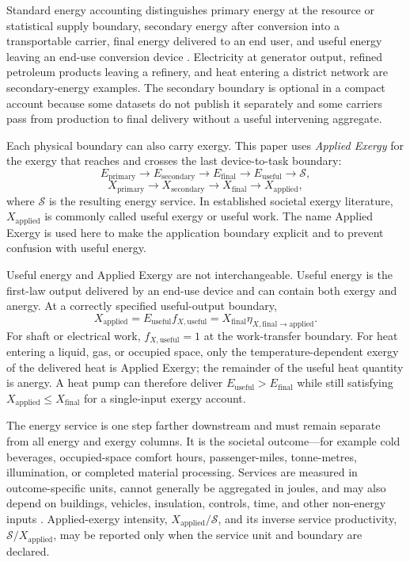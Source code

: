 \documentclass[11pt]{article}
\newcommand{\Xap}{X_{\mathrm{applied}}}
\begin{document}
Standard energy accounting distinguishes primary energy at the resource or statistical supply boundary, secondary energy after conversion into a transportable carrier, final energy delivered to an end user, and useful energy leaving an end-use conversion device \cite{ieaglossary,owiddefinitions,brockway2024}. Electricity at generator output, refined petroleum products leaving a refinery, and heat entering a district network are secondary-energy examples. The secondary boundary is optional in a compact account because some datasets do not publish it separately and some carriers pass from production to final delivery without a useful intervening aggregate.

Each physical boundary can also carry exergy. This paper uses \emph{Applied Exergy} for the exergy that reaches and crosses the last device-to-task boundary:
\begin{equation}
E_{\mathrm{primary}}\longrightarrow E_{\mathrm{secondary}}\longrightarrow E_{\mathrm{final}}\longrightarrow E_{\mathrm{useful}}\longrightarrow \mathcal{S},
\end{equation}
\begin{equation}
X_{\mathrm{primary}}\longrightarrow X_{\mathrm{secondary}}\longrightarrow X_{\mathrm{final}}\longrightarrow \Xap,
\end{equation}
where $\mathcal{S}$ is the resulting energy service. In established societal exergy literature, $\Xap$ is commonly called useful exergy or useful work. The name Applied Exergy is used here to make the application boundary explicit and to prevent confusion with useful energy.

Useful energy and Applied Exergy are not interchangeable. Useful energy is the first-law output delivered by an end-use device and can contain both exergy and anergy. At a correctly specified useful-output boundary,
\begin{equation}
\Xap=E_{\mathrm{useful}}f_{X,\mathrm{useful}}
=X_{\mathrm{final}}\eta_{X,\mathrm{final\rightarrow applied}}.
\end{equation}
For shaft or electrical work, $f_{X,\mathrm{useful}}=1$ at the work-transfer boundary. For heat entering a liquid, gas, or occupied space, only the temperature-dependent exergy of the delivered heat is Applied Exergy; the remainder of the useful heat quantity is anergy. A heat pump can therefore deliver $E_{\mathrm{useful}}>E_{\mathrm{final}}$ while still satisfying $\Xap\le X_{\mathrm{final}}$ for a single-input exergy account.

The energy service is one step farther downstream and must remain separate from all energy and exergy columns. It is the societal outcome---for example cold beverages, occupied-space comfort hours, passenger-miles, tonne-metres, illumination, or completed material processing. Services are measured in outcome-specific units, cannot generally be aggregated in joules, and may also depend on buildings, vehicles, insulation, controls, time, and other non-energy inputs \cite{ieaglossary}. Applied-exergy intensity, $\Xap/\mathcal{S}$, and its inverse service productivity, $\mathcal{S}/\Xap$, may be reported only when the service unit and boundary are declared.
\end{document}
